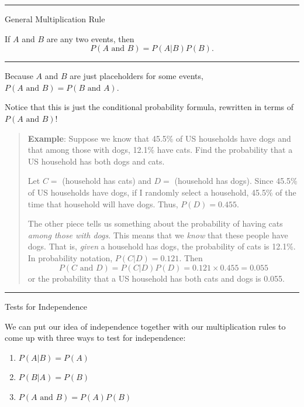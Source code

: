 \documentclass[
]{book}
\providecommand{\tightlist}{%
  \setlength{\itemsep}{0pt}\setlength{\parskip}{0pt}}
\begin{document}
\begin{center}\rule{0.5\linewidth}{0.5pt}\end{center}

General Multiplication Rule

If \(A\) and \(B\) are any two events, then \[P(A \text{ and }B) = P(A|B)P(B).\]

\begin{center}\rule{0.5\linewidth}{0.5pt}\end{center}

Because \(A\) and \(B\) are just placeholders for some events, \(P(A \text{ and } B) = P(B \text{ and } A)\).

Notice that this is just the conditional probability formula, rewritten in terms of \(P(A \text{ and }B)\)!

\begin{quote}
\textbf{Example}: Suppose we know that 45.5\% of US households have dogs and that among those with dogs, 12.1\% have cats. Find the probability that a US household has both dogs and cats.

Let \(C=\) (household has cats) and \(D=\) (household has dogs). Since 45.5\% of US households have dogs, if I randomly select a household, 45.5\% of the time that household will have dogs. Thus, \(P(D) = 0.455\).

The other piece tells us something about the probability of having cats \emph{among those with dogs}. This means that we \emph{know} that these people have dogs. That is, \emph{given} a household has dogs, the probability of cats is 12.1\%. In probability notation, \(P(C|D) = 0.121\). Then \[P(C \text{ and }D) = P(C|D)P(D) = 0.121\times 0.455 = 0.055\] or the probability that a US household has both cats and dogs is 0.055.
\end{quote}

\begin{center}\rule{0.5\linewidth}{0.5pt}\end{center}

Tests for Independence

We can put our idea of independence together with our multiplication rules to come up with three ways to test for independence:

\begin{enumerate}
\def\labelenumi{\arabic{enumi}.}
\tightlist
\item
  \(P(A|B)=P(A)\)
\item
  \(P(B|A)=P(B)\)
\item
  \(P(A \text{ and }B) = P(A)P(B)\)
\end{enumerate}
\end{document}
